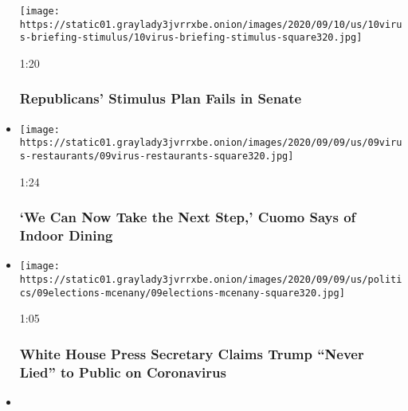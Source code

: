 \begin{itemize}
  \texttt{[image: https://static01.graylady3jvrrxbe.onion/images/2020/09/10/us/10virus-briefing-stimulus/10virus-briefing-stimulus-square320.jpg]}

  1:20

  \hypertarget{republicans-stimulus-plan-fails-in-senate}{%
  \subsubsection{Republicans' Stimulus Plan Fails in
  Senate}\label{republicans-stimulus-plan-fails-in-senate}}
\item
  \href{https://www.nytimes3xbfgragh.onion/video/us/politics/100000007332077/nyc-indoor-dining.html?action=click\&module=video-series-bar\&region=header\&pgtype=Article\&playlistId=video/coronavirus-news-update}{}

  \texttt{[image: https://static01.graylady3jvrrxbe.onion/images/2020/09/09/us/09virus-restaurants/09virus-restaurants-square320.jpg]}

  1:24

  \hypertarget{we-can-now-take-the-next-step-cuomo-says-of-indoor-dining}{%
  \subsubsection{`We Can Now Take the Next Step,' Cuomo Says of Indoor
  Dining}\label{we-can-now-take-the-next-step-cuomo-says-of-indoor-dining}}
\item
  \href{https://www.nytimes3xbfgragh.onion/video/us/politics/100000007331976/mcenany-trump-covid-virus.html?action=click\&module=video-series-bar\&region=header\&pgtype=Article\&playlistId=video/coronavirus-news-update}{}

  \texttt{[image: https://static01.graylady3jvrrxbe.onion/images/2020/09/09/us/politics/09elections-mcenany/09elections-mcenany-square320.jpg]}

  1:05

  \hypertarget{white-house-press-secretary-claims-trump-never-lied-to-public-on-coronavirus}{%
  \subsubsection{White House Press Secretary Claims Trump ``Never Lied''
  to Public on
  Coronavirus}\label{white-house-press-secretary-claims-trump-never-lied-to-public-on-coronavirus}}
\item
  \href{https://www.nytimes3xbfgragh.onion/video/world/europe/100000007331793/boris-johnson-covid-restrictions.html?action=click\&module=video-series-bar\&region=header\&pgtype=Article\&playlistId=video/coronavirus-news-update}{}


\end{itemize}
